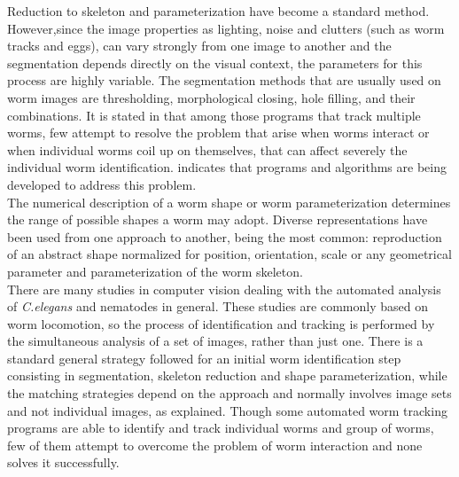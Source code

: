 Reduction to skeleton and parameterization have become a standard method. 
However,since the image properties as lighting, noise and clutters 
(such as worm tracks and eggs), can vary strongly from one image to another and 
the segmentation depends directly on the visual context, the  
parameters for this process are highly variable. The segmentation methods 
that are usually used 
on worm images are thresholding, morphological closing, 
hole filling, and their combinations.
It is stated in \cite{automated} that among those programs that track 
multiple worms, few attempt to resolve the problem that arise when 
worms interact or when individual worms coil up on themselves, that can
affect severely the individual worm identification. \cite{huang} indicates
that programs and algorithms are being developed to address this problem.\\

The  numerical description of a worm shape or worm parameterization 
determines the range of possible shapes a worm may adopt. Diverse 
representations have been used from one approach to another, being the 
most common: reproduction of an abstract shape normalized for position, 
orientation, scale or any geometrical parameter and parameterization of the 
worm skeleton.\\

There are many studies in computer vision dealing with the automated
analysis of \emph{C.elegans} and nematodes in general. These studies are
commonly based on worm locomotion, so the process of identification and 
tracking is performed by the simultaneous analysis of a set of images, rather
than just one. There is a standard general strategy followed for an initial
worm identification step consisting in segmentation, skeleton reduction and
shape parameterization, while the matching strategies depend on the approach
and normally involves image sets and not individual images, as explained.
Though some automated worm tracking programs are able to identify and track
individual worms and group of worms, few of them attempt to overcome the 
problem of worm interaction and none solves it successfully.

